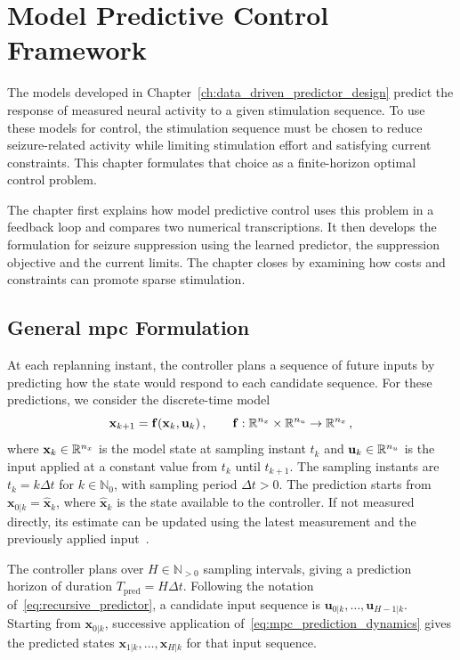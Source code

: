 \chapter{Model Predictive Control Framework}\label{ch:mpc_framework}

The models developed in Chapter~\ref{ch:data_driven_predictor_design} predict the response of measured neural activity to a given stimulation sequence.
To use these models for control, the stimulation sequence must be chosen to reduce seizure-related activity while limiting stimulation effort and satisfying current constraints.
This chapter formulates that choice as a finite-horizon optimal control problem.

The chapter first explains how model predictive control uses this problem in a feedback loop and compares two numerical transcriptions.
It then develops the formulation for seizure suppression using the learned predictor, the suppression objective and the current limits.
The chapter closes by examining how costs and constraints can promote sparse stimulation.

\section{General \acs{mpc} Formulation}\label{sec:mpc_formulation}

At each replanning instant, the controller plans a sequence of future inputs by predicting how the state would respond to each candidate sequence.
For these predictions, we consider the discrete-time model
%
\begin{equation}
    \mathbf{x}_{k+1} = \mathbf{f}(\mathbf{x}_k,\mathbf{u}_k)\,,
    \qquad \mathbf{f}:\mathbb{R}^{n_{x}}\times\mathbb{R}^{n_{u}}\to\mathbb{R}^{n_{x}}\,,
    \label{eq:mpc_prediction_dynamics}
\end{equation}
%
where $\mathbf{x}_k\in\mathbb{R}^{n_{x}}$ is the model state at sampling instant $t_k$ and $\mathbf{u}_k\in\mathbb{R}^{n_{u}}$ is the input applied at a constant value from $t_k$ until $t_{k+1}$.
The sampling instants are $t_k=k\Delta t$ for $k\in\mathbb{N}_0$, with sampling period $\Delta t>0$.
The prediction starts from $\mathbf{x}_{0|k}=\hat{\mathbf{x}}_k$, where $\hat{\mathbf{x}}_k$ is the state available to the controller.
If not measured directly, its estimate can be updated using the latest measurement and the previously applied input~\cite{Findeisen2003}.

The controller plans over $H\in\mathbb{N}_{>0}$ sampling intervals, giving a prediction horizon of duration $T_{\mathrm{pred}}=H\Delta t$.
Following the notation of~\eqref{eq:recursive_predictor}, a candidate input sequence is $\mathbf{u}_{0|k},\ldots,\mathbf{u}_{H-1|k}$.
Starting from $\mathbf{x}_{0|k}$, successive application of~\eqref{eq:mpc_prediction_dynamics} gives the predicted states $\mathbf{x}_{1|k},\ldots,\mathbf{x}_{H|k}$ for that input sequence.

